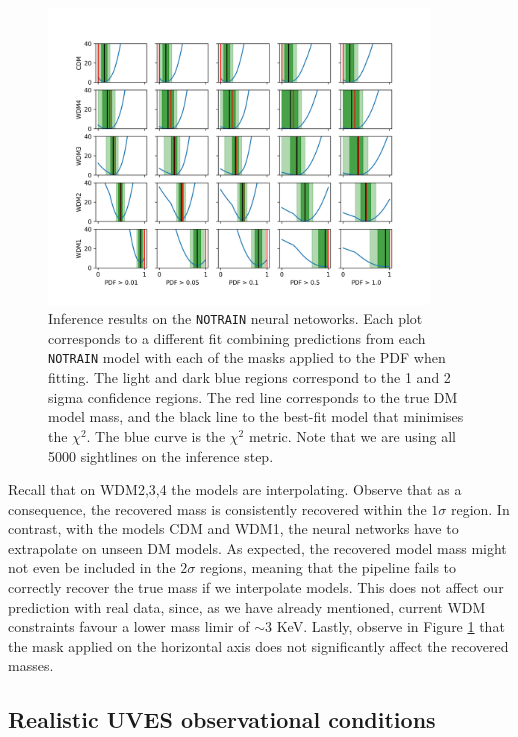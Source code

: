 \begin{figure}
    \centering
    \includegraphics[width=0.9\textwidth]{img/ML/inference_no_train.png}
    \caption{Inference results on the \texttt{NOTRAIN} neural netoworks. Each plot corresponds to a different fit combining predictions from each \texttt{NOTRAIN} model with each of the masks applied to the PDF when fitting. The light and dark blue regions correspond to the 1 and 2 sigma confidence regions. The red line corresponds to the true DM model mass, and the black line to the best-fit model that minimises the $\chi^2$. The blue curve is the $\chi^2$ metric. Note that we are using all 5000 sightlines on the inference step.}
    \label{fig:inference no train}
\end{figure}
Recall that on WDM2,3,4 the models are interpolating. Observe that as a consequence, the recovered mass is consistently recovered within the $1\sigma$ region. In contrast, with the models CDM and WDM1, the neural networks have to extrapolate on unseen DM models. As expected, the recovered model mass might not even be included in the $2\sigma$ regions, meaning that the pipeline fails to correctly recover the true mass if we interpolate models. This does not affect our prediction with real data, since, as we have already mentioned, current WDM constraints favour a lower mass limir of $\sim 3$ KeV. Lastly, observe in Figure \ref{fig:inference no train} that the mask applied on the horizontal axis does not significantly affect the recovered masses.


\subsection{Realistic UVES observational conditions}\label{sec:hires test}

